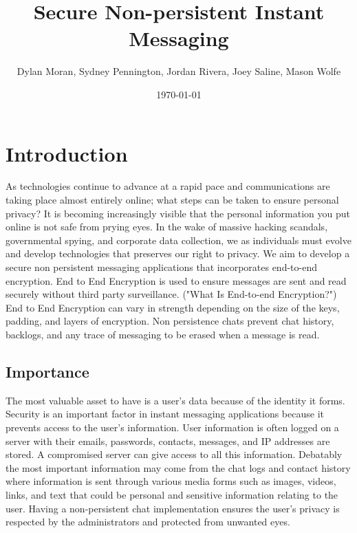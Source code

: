 \documentclass[11pt]{article}
\date{
\today
}
\theoremstyle{plain}
\theoremstyle{definition}
\begin{document}
\title{Secure Non-persistent Instant Messaging}
\author{Dylan Moran, Sydney Pennington, Jordan Rivera, Joey Saline, Mason Wolfe}
\maketitle



\section{Introduction}\label{sec:intro}
As technologies continue to advance at a rapid pace and communications are taking place almost entirely online; what steps can be taken to ensure personal privacy? It is becoming increasingly visible that the personal information you put online is not safe from prying eyes. In the wake of massive hacking scandals, governmental spying, and corporate data collection, we as individuals must evolve and develop technologies that preserves our right to privacy. We aim to develop a secure non persistent messaging applications that incorporates end-to-end encryption. End to End Encryption is used to ensure messages are sent and read securely without third party surveillance. ("What Is End-to-end Encryption?") End to End Encryption can vary in strength depending on the size of the keys, padding, and layers of encryption. Non persistence chats prevent chat history, backlogs, and any trace of messaging to be erased when a message is read.

\subsection{Importance}\label{sec:importance}
The most valuable asset to have is a user’s data because of the identity it forms. Security is an important factor in instant messaging applications because it prevents access to the user’s information. User information is often logged on a server with their emails, passwords, contacts, messages, and IP addresses are stored. A compromised server can give access to all this information. Debatably the most important information may come from the chat logs and contact history where information is sent through various media forms such as images, videos, links, and text that could be personal and sensitive information relating to the user. Having a non-persistent chat implementation ensures the user’s privacy is respected by the administrators and protected from unwanted eyes.
\end{document}
